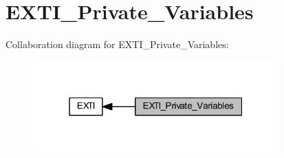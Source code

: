 \hypertarget{group___e_x_t_i___private___variables}{}\section{E\+X\+T\+I\+\_\+\+Private\+\_\+\+Variables}
\label{group___e_x_t_i___private___variables}
Collaboration diagram for E\+X\+T\+I\+\_\+\+Private\+\_\+\+Variables\+:
\nopagebreak
\begin{figure}[H]
\begin{center}
\leavevmode
\includegraphics[width=268pt]{group___e_x_t_i___private___variables}
\end{center}
\end{figure}
